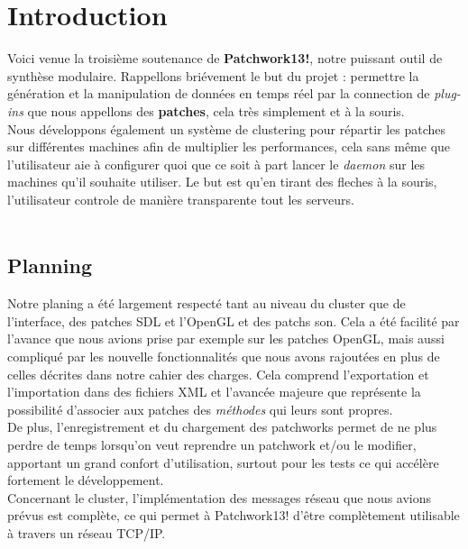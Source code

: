 \chapter{Introduction}

Voici venue la troisi\`eme soutenance de {\bf Patchwork13!},
notre puissant outil
de synth\`ese modulaire. Rappellons bri\'evement le but du projet :
permettre la g\'en\'eration et la manipulation de donn\'ees en
temps r\'eel par la connection de {\em plug-ins} que nous appellons des
{\bf patches}, cela tr\`es simplement et \`a la souris.\\

Nous d\'eveloppons \'egalement un syst\`eme de clustering pour r\'epartir
les patches sur diff\'erentes machines afin de multiplier les performances,
cela sans m\^eme que l'utilisateur aie \`a configurer quoi que ce soit \`a
part lancer le {\em daemon} sur les machines qu'il souhaite utiliser.
Le but est qu'en tirant des fleches \`a la souris, l'utilisateur controle
de mani\`ere transparente tout les serveurs.\\
\\

\section{Planning}
Notre planing a \'et\'e largement respect\'e tant au niveau du cluster que 
de l'interface, des patches SDL et l'OpenGL et des patchs son. Cela a
\'et\'e facilit\'e par l'avance que nous avions prise par exemple sur les
patches OpenGL, mais aussi compliqu\'e par les nouvelle fonctionnalit\'es
que nous avons rajout\'ees en plus de celles d\'ecrites dans notre cahier des
charges. Cela comprend l'exportation et l'importation dans des fichiers XML
et l'avanc\'ee majeure que repr\'esente la possibilit\'e d'associer aux
patches des {\em m\'ethodes} qui leurs sont propres.\\

De plus, l'enregistrement et du chargement des patchworks 
permet de ne plus perdre de temps lorsqu'on veut reprendre
un patchwork et/ou le modifier, apportant un grand confort
d'utilisation, surtout pour les tests ce qui acc\'el\`ere
fortement le d\'eveloppement.\\

Concernant le cluster, l'impl\'ementation des messages r\'eseau que nous 
avions pr\'evus est compl\`ete, ce qui permet \`a Patchwork13! d'\^etre
compl\`etement utilisable \`a travers un r\'eseau TCP/IP.\\

